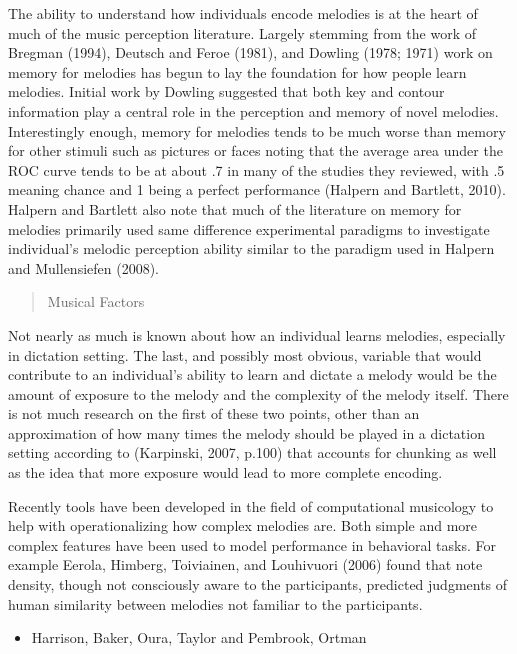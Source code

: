 \documentclass[]{book}
\providecommand{\tightlist}{%
  \setlength{\itemsep}{0pt}\setlength{\parskip}{0pt}}
\begin{document}
The ability to understand how individuals encode melodies is at the heart of much of the music perception literature.
Largely stemming from the work of Bregman (1994), Deutsch and Feroe (1981), and Dowling (1978; 1971) work on memory for melodies has begun to lay the foundation for how people learn melodies.
Initial work by Dowling suggested that both key and contour information play a central role in the perception and memory of novel melodies.
Interestingly enough, memory for melodies tends to be much worse than memory for other stimuli such as pictures or faces noting that the average area under the ROC curve tends to be at about .7 in many of the studies they reviewed, with .5 meaning chance and 1 being a perfect performance (Halpern and Bartlett, 2010).
Halpern and Bartlett also note that much of the literature on memory for melodies primarily used same difference experimental paradigms to investigate individual's melodic perception ability similar to the paradigm used in Halpern and Mullensiefen (2008).

\begin{quote}
Musical Factors
\end{quote}

Not nearly as much is known about how an individual learns melodies, especially in dictation setting.
The last, and possibly most obvious, variable that would contribute to an individual's ability to learn and dictate a melody would be the amount of exposure to the melody and the complexity of the melody itself.
There is not much research on the first of these
two points, other than an approximation of how many times the melody should be played in a dictation setting according to (Karpinski, 2007, p.100) that accounts for chunking as well as the idea that more exposure would lead to more complete encoding.

Recently tools have been developed in the field of computational musicology to help with operationalizing how
complex melodies are.
Both simple and more complex features have been used to model performance in behavioral tasks.
For example Eerola, Himberg, Toiviainen, and Louhivuori (2006) found that note density, though not consciously aware to the participants, predicted judgments of human similarity between melodies not familiar to the participants.

\begin{itemize}
\tightlist
\item
  Harrison, Baker, Oura, Taylor and Pembrook, Ortman
\end{itemize}
\end{document}
